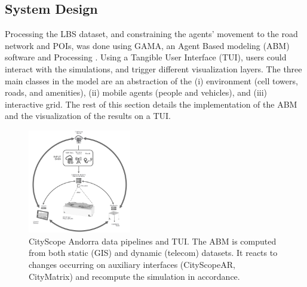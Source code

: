 {    \subsection{System Design}
    {
        Processing the LBS dataset, and constraining the agents' movement to the road network and POIs, was done using GAMA, an Agent Based modeling (ABM) software \cite{grignard2013gama} and Processing \cite{reas2007processing}. Using a Tangible User Interface (TUI), users could interact with the simulations, and trigger different visualization layers. The three main classes in the model are an abstraction of the (i) environment (cell towers, roads, and amenities), (ii) mobile agents (people and vehicles), and (iii) interactive grid. The rest of this section details the implementation of the ABM and the visualization of the results on a TUI.

        \begin{figure}[h]
            \begin{center}
                \includegraphics[width=0.4\textwidth]{chapters/insight/and_abm/figures/and_cdr_arch.png}
            \end{center}
            \caption{CityScope Andorra data pipelines and TUI. The ABM is computed from both static (GIS) and dynamic (telecom) datasets. It reacts to changes occurring on auxiliary interfaces (CityScopeAR, CityMatrix) and recompute the simulation in accordance.}
            \label{fig:and_cdr_arch}
        \end{figure}


}}
